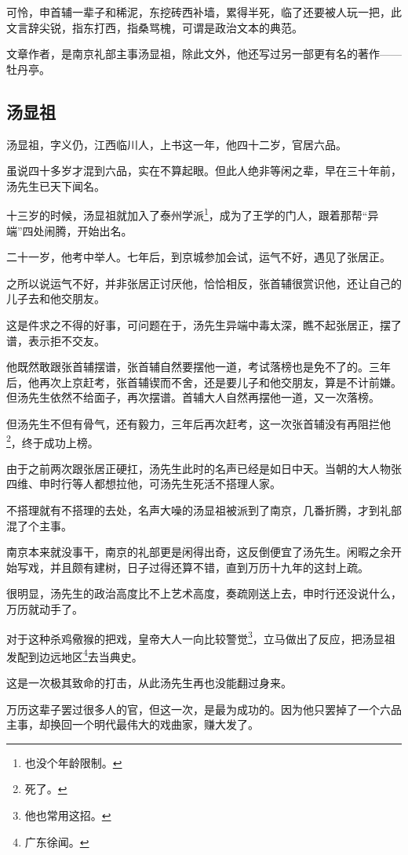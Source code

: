 \begin{multicols}{\theparacolNo}
		可怜，申首辅一辈子和稀泥，东挖砖西补墙，累得半死，临了还要被人玩一把，此文言辞尖锐，指东打西，指桑骂槐，可谓是政治文本的典范。

		文章作者，是南京礼部主事汤显祖，除此文外，他还写过另一部更有名的著作——牡丹亭。

		\subsection{汤显祖}
		汤显祖，字义仍，江西临川人，上书这一年，他四十二岁，官居六品。

		虽说四十多岁才混到六品，实在不算起眼。但此人绝非等闲之辈，早在三十年前，汤先生已天下闻名。

		十三岁的时候，汤显祖就加入了泰州学派\footnote{也没个年龄限制。}，成为了王学的门人，跟着那帮“异端”四处闹腾，开始出名。

		二十一岁，他考中举人。七年后，到京城参加会试，运气不好，遇见了张居正。

		之所以说运气不好，并非张居正讨厌他，恰恰相反，张首辅很赏识他，还让自己的儿子去和他交朋友。

		这是件求之不得的好事，可问题在于，汤先生异端中毒太深，瞧不起张居正，摆了谱，表示拒不交友。

		他既然敢跟张首辅摆谱，张首辅自然要摆他一道，考试落榜也是免不了的。三年后，他再次上京赶考，张首辅锲而不舍，还是要儿子和他交朋友，算是不计前嫌。但汤先生依然不给面子，再次摆谱。首辅大人自然再摆他一道，又一次落榜。

		但汤先生不但有骨气，还有毅力，三年后再次赶考，这一次张首辅没有再阻拦他\footnote{死了。}，终于成功上榜。

		由于之前两次跟张居正硬扛，汤先生此时的名声已经是如日中天。当朝的大人物张四维、申时行等人都想拉他，可汤先生死活不搭理人家。

		不搭理就有不搭理的去处，名声大噪的汤显祖被派到了南京，几番折腾，才到礼部混了个主事。

		南京本来就没事干，南京的礼部更是闲得出奇，这反倒便宜了汤先生。闲暇之余开始写戏，并且颇有建树，日子过得还算不错，直到万历十九年的这封上疏。

		很明显，汤先生的政治高度比不上艺术高度，奏疏刚送上去，申时行还没说什么，万历就动手了。

		对于这种杀鸡儆猴的把戏，皇帝大人一向比较警觉\footnote{他也常用这招。}，立马做出了反应，把汤显祖发配到边远地区\footnote{广东徐闻。}去当典史。

		这是一次极其致命的打击，从此汤先生再也没能翻过身来。

		万历这辈子罢过很多人的官，但这一次，是最为成功的。因为他只罢掉了一个六品主事，却换回一个明代最伟大的戏曲家，赚大发了。


\end{multicols}
